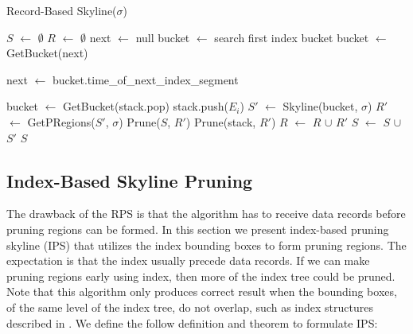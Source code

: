 \begin{algorithm}[t]
\caption{Record-Based Skyline($\sigma$)} \label{alg:RBSkyline}
\begin{algorithmic}[1]

\STATE $S$ $\gets$ $\emptyset$
\STATE $R$ $\gets$ $\emptyset$
\REPEAT
    \STATE next $\gets$ null
        \STATE bucket $\gets$ search first index bucket
    \ELSE
        \STATE bucket $\gets$ GetBucket(next)
    \ENDIF

        \STATE next $\gets$ bucket.time\_of\_next\_index\_segment
    \ENDIF

            \STATE bucket $\gets$ GetBucket(stack.pop)
        \ENDIF
                    \STATE stack.push($E_i$)
                \ENDIF
            \ENDFOR
        \ELSE
            \STATE $S'$ $\gets$ Skyline(bucket, $\sigma$)
            \STATE $R'$ $\gets$ GetPRegions($S'$, $\sigma$)
            \STATE Prune($S$, $R'$)
            \STATE Prune(stack, $R'$)
            \STATE $R$ $\gets$ $R$ $\cup$ $R'$
            \STATE $S$ $\gets$ $S$ $\cup$ $S'$
        \ENDIF
    \ENDWHILE
{}
\RETURN $S$
\end{algorithmic}
\end{algorithm}


\subsection{Index-Based Skyline Pruning}\label{sec-IPS}

The drawback of the RPS is that the algorithm has to receive data records before pruning regions can be formed. In this section we present index-based pruning skyline (IPS) that utilizes the index bounding boxes to form pruning regions. The expectation is that the index usually precede data records. If we can make pruning regions early using index, then more of the index tree could be pruned. Note that this algorithm only produces correct result when the bounding boxes, of the same level of the index tree, do not overlap, such as index structures described in \cite{DBLP:conf/vldb/SellisRF87}\cite{DBLP:journals/acta/FinkelB74}\cite{DBLP:conf/compgeom/Bentley90}. We define the follow definition and theorem to formulate IPS:

